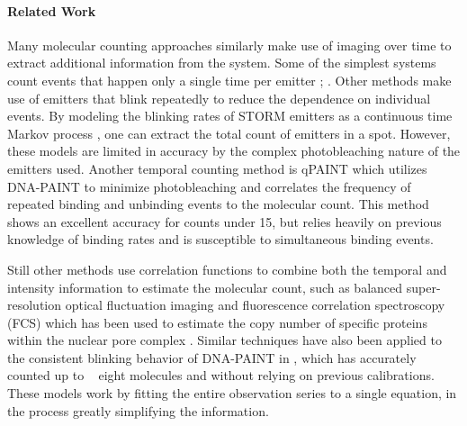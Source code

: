 \paragraph{Related Work}

Many molecular counting approaches similarly
  make use of imaging over time to extract additional information from the
  system. 
Some of the simplest systems count events that happen only a single time per emitter \cite{Ulbrich_subunit_2007}; \cite{gunzenhauser_quantitative_2012}.
Other methods make use of emitters that blink repeatedly to reduce the
dependence on individual events.
%
  By modeling the blinking rates of STORM emitters as a continuous time
  Markov process \cite{patel_blinking_2021, rollins_stochastic_2015}, one can extract the total count of emitters
  in a spot. However, these models are limited in accuracy by the complex
  photobleaching nature of the emitters used. Another temporal counting method is
  qPAINT \cite{jungmann_quantitative_2016} which utilizes DNA-PAINT to minimize photobleaching and
  correlates the frequency of repeated binding and unbinding events to the
  molecular count. This method shows an excellent accuracy for counts under 15,
  but relies heavily on previous knowledge of binding rates and is
  susceptible to simultaneous binding events.

%
  Still other methods use correlation functions to combine both the temporal and
  intensity information to estimate the molecular count, such as balanced
  super-resolution optical fluctuation imaging and fluorescence
  correlation spectroscopy (FCS) which has been used to estimate the copy
  number of specific proteins within the nuclear pore complex
  \cite{otsuka_quantitative_2023}. Similar techniques have also been applied to the
  consistent blinking behavior of DNA-PAINT in \lbfcs \cite{stein_calibration-free_2021}, which has
  accurately counted up to ~ eight molecules and without relying on previous
  calibrations. These models work by fitting the entire observation series to a
  single equation, in the process greatly simplifying the information. 
